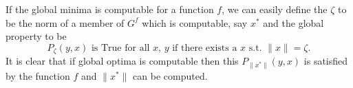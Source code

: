 	\begin{remark}
		If the global minima is computable for a function $f$, we can easily define the $\zeta$ to be the norm of a member of $G^f$ which is computable, say $x^*$ and the global property to be 
		\[ P_{\zeta}(y,x) \mbox{ is True for all } x, \, y \mbox{ if there exists a } x \mbox{ s.t. } \parallel x \parallel = \zeta.\]
		It is clear that if global optima is computable then this $P_{\parallel x^* \parallel}(y,x)$ is satisfied by the function $f$ and $\parallel x^* \parallel$ can be computed.
		
		
		
		
	\end{remark}
	

